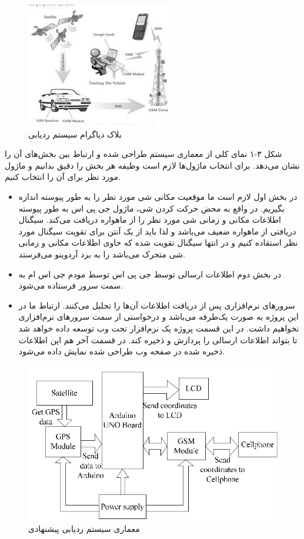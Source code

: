 \begin{figure}[!h]
	\centerline{\includegraphics[width=.5\textwidth]{architecture}}
	\caption{بلاک دیاگرام سیستم ردیابی \cite{bidabad}}
\end{figure}
شکل ۳-۱ نمای کلی از معماری سیستم طراحی شده و ارتباط بین بخش‌های آن را نشان می‌دهد. برای انتخاب ماژول‌ها لازم است وظیفه هر بخش را دقیق بدانیم و ماژول مورد نظر برای آن را انتخاب کنیم.
\begin{itemize}
	\item 
	در بخش اول لازم است ما موقعیت مکانی شی مورد نظر را به طور پیوسته اندازه بگیریم. در واقع به محض حرکت کردن شی، ماژول جی پی اس به طور پیوسته اطلاعات مکانی و زمانی شی مورد نظر را از ماهواره دریافت می‌کند. سیگنال دریافتی از ماهواره ضعیف می‌باشد و لذا باید از یک آنتن برای تقویت سیگنال مورد نظر استقاده کنیم و در انتها سیگنال تقویت شده که حاوی اطلاعات مکانی و زمانی شی متحرک می‌باشد را به برد آردوینو می‌فرستد.
	\item 
	در بخش دوم اطلاعات ارسالی توسط جی پی اس توسط مودم جی اس ام به سمت سرور فرستاده می‌شود.
	\item 
	سرورهای نرم‌افزاری پس از دریافت اطلاعات آن‌ها را تحلیل می‌کنند. ارتباط ما در این پروژه به صورت یک‌طرفه می‌باشد و درخواستی از سمت سرورهای نرم‌افزاری نخواهیم داشت. در این قسمت پروژه یک نرم‌افزار تحت وب توسعه داده خواهد شد تا بتواند اطلاعات ارسالی را پردازش و ذخیره کند. در قسمت آخر هم این اطلاعات ذخیره شده در صفحه وب طراحی شده نمایش داده می‌شود. 	 
\end{itemize}
\begin{figure}[!h]
	\centerline{\includegraphics[width=.5\textwidth]{blockdiagram}}
	\caption{معماری سیستم ردیابی پیشنهادی}
\end{figure}
